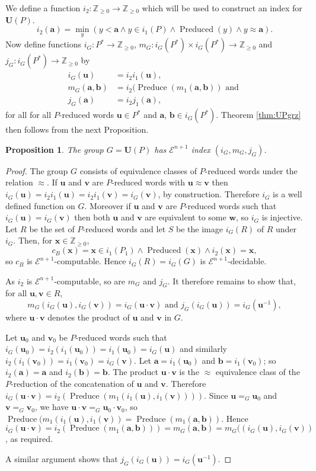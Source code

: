 \documentclass[a4paper]{article}
\newcommand{\grz}[1]{$\mathcal{E}^{#1}$}	%
\newcommand{\ZZ}{\mathbb{Z}}
\newcommand{\maps}{\longrightarrow}
\newcommand{\avec}{\mathbf{a}}	%
\newcommand{\bvec}{\mathbf{b}}	%
\newcommand{\uvec}{\mathbf{u}}	%
\newcommand{\vvec}{\mathbf{v}}	%
\newcommand{\wvec}{\mathbf{w}}	%
\newcommand{\xvec}{\mathbf{x}}	%
\newcommand{\Uvec}{\mathbf{U}}	%
\newcommand{\UP}{\Uvec(P)}
\newcommand{\Preduced}{\operatorname{Preduced}}
\newcommand{\Preduce}{\operatorname{Preduce}}
\theoremstyle{plain}
\newtheorem{proposition}[theorem]{Proposition}
\theoremstyle{definition}
\begin{document}
We define a function $i_2:\ZZ_{\geq 0}\maps \ZZ_{\geq 0}$ which will be used to construct an
index for $\UP$. 
\begin{equation}\label{eq:i2}
i_2(\avec)=\min_y(y<\avec \wedge y\in i_1(P) \wedge \Preduced(y) \wedge y\approx \avec).
\end{equation}
Now define functions $i_G:P^*\maps \ZZ_{\geq 0}$, 
$m_G:i_G(P^*)\times i_G(P^*) \maps \ZZ_{\geq 0}$
and $j_G:i_G(P^*)\maps \ZZ_{\geq 0}$ by 
\begin{align}
i_G(\uvec) &=i_2i_1(\uvec),\\
m_G(\avec, \bvec)& =i_2(\Preduce(m_1(\avec,\bvec)) \textrm{ and }\\
j_G(\avec)&= i_2j_1(\avec),
\end{align}
for all for all $P$-reduced words $\uvec\in P^*$ and $\avec$, $\bvec \in i_G(P^*)$. 
Theorem \ref{thm:UPgrz} then follows from the next Proposition. 
\begin{proposition}
The group $G=\UP$ has \grz{n+1} index $(i_G,m_G,j_G)$. 
\end{proposition}

\begin{proof}
The group $G$ consists of equivalence classes of $P$-reduced words under the  relation $\approx$.
If $\uvec$ and $\vvec$ are $P$-reduced words with $\uvec\approx \vvec$ then 
$i_G(\uvec)=i_2i_1(\uvec)=i_2i_1(\vvec)=i_G(\vvec)$, by construction. Therefore $i_G$ is 
a well defined function on $G$.  Moreover if  $\uvec$ and $\vvec$ are $P$-reduced words
such that $i_G(\uvec)=i_G(\vvec)$ then both $\uvec$ and 
$\vvec$ are equivalent to some $\wvec$, so $i_G$ is injective. Let $R$ be the set of 
$P$-reduced words and let $S$ be the image $i_G(R)$ of $R$ under $i_G$. Then, for $\xvec\in \ZZ_{\geq 0}$, 
\[c_B(\xvec)=\xvec\in i_1(P_1) \wedge \Preduced(\xvec) \wedge i_2(\xvec)=\xvec,\]
so $c_B$ is \grz{n+1}-computable. Hence $i_G(R)=i_G(G)$ is \grz{n+1}-decidable. 

As $i_2$ is \grz{n+1}-computable, so are $m_G$ and $j_G$. It therefore remains to
show that, for all $\uvec,\vvec \in R$, 
\[m_G(i_G(\uvec),i_G(\vvec))=i_G(\uvec\cdot \vvec)\textrm{ and } j_G(i_G(\uvec))=i_G(\uvec^{-1}),\]
where $\uvec\cdot \vvec$ denotes the product of $\uvec$ and $\vvec$ in $G$. 

Let $\uvec_0$ and $\vvec_0$ be $P$-reduced words such that $i_G(\uvec_0)=i_2(i_1(\uvec_0))=i_1(\uvec_0)=
i_G(\uvec)$ and similarly $i_2(i_1(\vvec_0))=i_1(\vvec_0)=
i_G(\vvec)$. Let $\avec=i_1(\uvec_0)$ and $\bvec=i_1(\vvec_0)$; so $i_2(\avec)=\avec$ and 
$i_2(\bvec)=\bvec$.  
The product  $\uvec\cdot \vvec$ is the $\approx$ equivalence class of the
$P$-reduction of the concatenation of $\uvec$ and $\vvec$. Therefore 
$i_G(\uvec\cdot \vvec)=i_2(\Preduce(m_1(i_1(\uvec),i_1(\vvec))))$.  
Since $\uvec=_G \uvec_0$ and $\vvec=_G \vvec_0$, we have $\uvec\cdot \vvec=_G \uvec_0\cdot \vvec_0$, 
so  $\Preduce(m_1(i_1(\uvec),i_1(\vvec))= \Preduce(m_1(\avec,\bvec)).$ Hence 
$i_G(\uvec\cdot \vvec)=i_2(\Preduce(m_1(\avec,\bvec)))=m_G(\avec,\bvec)=m_G((i_G(\uvec),i_G(\vvec))$,
 as required.

A similar argument shows that $j_G(i_G(\uvec))=i_G(\uvec^{-1})$.
\end{proof}
\end{document}
